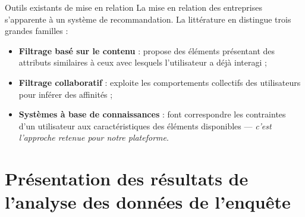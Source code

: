 \documentclass[aspectratio=169, 10pt]{beamer}
\begin{document}
\begin{frame}{Outils existants de mise en relation}
    La mise en relation des entreprises s'apparente à un système de recommandation. La littérature en distingue trois grandes familles :
    \begin{itemize}
        \item \textbf{Filtrage basé sur le contenu} : propose des éléments présentant des attributs similaires à ceux avec lesquels l'utilisateur a déjà interagi ;
        \item \textbf{Filtrage collaboratif} : exploite les comportements collectifs des utilisateurs pour inférer des affinités ;
        \item \textbf{Systèmes à base de connaissances} : font correspondre les contraintes d'un utilisateur aux caractéristiques des éléments disponibles — \textit{c'est l'approche retenue pour notre plateforme}.
    \end{itemize}
\end{frame}

\section{Présentation des résultats de l'analyse des données de l'enquête}
\end{document}
